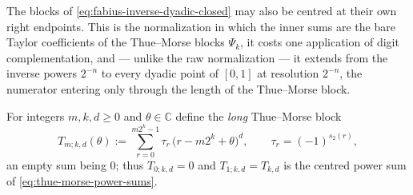 \documentclass[11pt,oneside,openany]{book}
\theoremstyle{definition}
\theoremstyle{remark}
\newcommand{\C}{\mathbb C}
\newcommand{\defeq}{\mathrel{:=}}
\begin{document}

The blocks of \eqref{eq:fabius-inverse-dyadic-closed} may also be centred at their
own right endpoints.  This is the normalization in which the inner sums are the
bare Taylor coefficients of the Thue--Morse blocks $\Psi_k$, it costs one
application of digit complementation, and --- unlike the raw normalization --- it
extends from the inverse powers $2^{-n}$ to every dyadic point of $[0,1]$ at
resolution $2^{-n}$, the numerator entering only through the length of the
Thue--Morse block.

For integers $m,k,d\ge0$ and $\theta\in\C$ define the \emph{long} Thue--Morse block
\begin{equation}\label{eq:fabius-long-block}
 T_{m;k,d}(\theta)\defeq\sum_{r=0}^{m2^k-1}\tau_r\,\bigl(r-m2^k+\theta\bigr)^d,
 \qquad \tau_r=(-1)^{s_2(r)},
\end{equation}
an empty sum being $0$; thus $T_{0;k,d}=0$ and $T_{1;k,d}=T_{k,d}$ is the centred
power sum of \eqref{eq:thue-morse-power-sums}.
\end{document}
